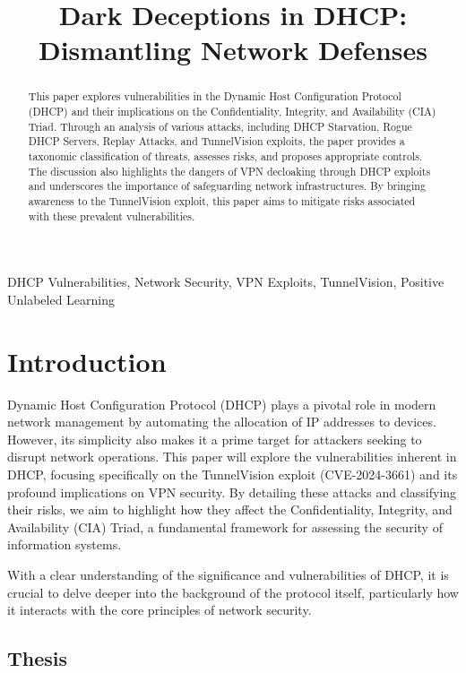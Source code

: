 \documentclass[conference]{IEEEtran}
\title{Dark Deceptions in DHCP: Dismantling Network Defenses}
\author{
    \IEEEauthorblockN{Robert Dilworth}
    \IEEEauthorblockA{
        {Department of Computer Science and Engineering} \\
        {Mississippi State University} \\
        {Starkville, Mississippi, USA} \\
        {\href{https://orcid.org/0009-0005-5497-9810}{rkd103@msstate.edu}}
    }
}
\begin{document}
\maketitle

\begin{abstract}
    This paper explores vulnerabilities in the Dynamic Host Configuration Protocol (DHCP) and their implications on the Confidentiality, Integrity, and Availability (CIA) Triad. Through an analysis of various attacks, including DHCP Starvation, Rogue DHCP Servers, Replay Attacks, and TunnelVision exploits, the paper provides a taxonomic classification of threats, assesses risks, and proposes appropriate controls. The discussion also highlights the dangers of VPN decloaking through DHCP exploits and underscores the importance of safeguarding network infrastructures. By bringing awareness to the TunnelVision exploit, this paper aims to mitigate risks associated with these prevalent vulnerabilities.
\end{abstract}

\begin{IEEEkeywords}
    DHCP Vulnerabilities,
    Network Security,
    VPN Exploits,
    TunnelVision,
    Positive Unlabeled Learning
\end{IEEEkeywords}

\section{Introduction}
\label{sec:Introduction}

    Dynamic Host Configuration Protocol (DHCP) plays a pivotal role in modern network management by automating the allocation of IP addresses to devices. However, its simplicity also makes it a prime target for attackers seeking to disrupt network operations. This paper will explore the vulnerabilities inherent in DHCP, focusing specifically on the TunnelVision exploit (CVE-2024-3661) and its profound implications on VPN security. By detailing these attacks and classifying their risks, we aim to highlight how they affect the Confidentiality, Integrity, and Availability (CIA) Triad, a fundamental framework for assessing the security of information systems.

    With a clear understanding of the significance and vulnerabilities of DHCP, it is crucial to delve deeper into the background of the protocol itself, particularly how it interacts with the core principles of network security.

    \subsection{Thesis}
    \label{subsec:Thesis}
\end{document}
